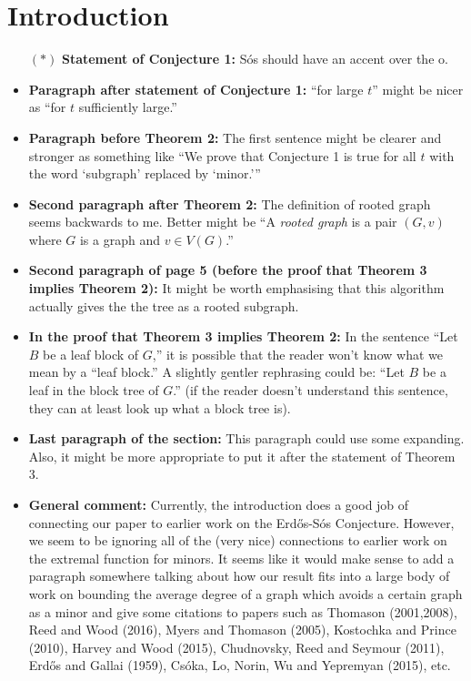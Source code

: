 \documentclass[11 pt]{article}
\begin{document}
\section{Introduction}

\begin{itemize}
\item[$\boldsymbol{(*)}$] \textbf{Statement of Conjecture 1:} S\'os should have an accent over the o. 
\item \textbf{Paragraph after statement of Conjecture 1:} ``for large $t$'' might be nicer as ``for $t$ sufficiently large.''
\item \textbf{Paragraph before Theorem 2:} The first sentence might be clearer and stronger as something like ``{We prove that Conjecture 1 is true for all $t$ with the word `subgraph' replaced by `minor.'}''
\item \textbf{Second paragraph after Theorem 2:} The definition of rooted graph seems backwards to me. Better might be ``A \emph{rooted graph} is a pair $(G,v)$ where $G$ is a graph and $v\in V(G)$.''
\item\textbf{Second paragraph of page 5 (before the proof that Theorem 3 implies Theorem 2):} It might be worth emphasising that this algorithm actually gives the the tree as a rooted subgraph. 
\item \textbf{In the proof that Theorem 3 implies Theorem 2:}  In the sentence ``Let $B$ be a leaf block of $G$,'' it is possible that the reader won't know what we mean by a ``leaf block.'' A slightly gentler rephrasing could be: ``Let $B$ be a leaf in the block tree of $G$.'' (if the reader doesn't understand this sentence, they can at least look up what a block tree is). 
\item \textbf{Last paragraph of the section:} This paragraph could use some expanding. Also, it might be more appropriate to put it after the statement of Theorem 3. 
\item \textbf{General comment:} Currently, the introduction does a good job of connecting our paper to earlier work on the Erd\H{o}s-S\'os Conjecture. However, we seem to be ignoring all of the (very nice) connections to earlier work on the extremal function for minors. It seems like it would make sense to add a paragraph somewhere talking about how our result fits into a large body of work on bounding the average degree of a graph which avoids a certain graph as a minor and give some citations to papers such as Thomason (2001,2008), Reed and Wood (2016), Myers and Thomason (2005), Kostochka and Prince (2010), Harvey and Wood (2015), Chudnovsky, Reed and Seymour (2011), Erd\H{o}s and Gallai (1959), Cs\'oka, Lo, Norin, Wu and Yepremyan (2015), etc. 
\end{itemize}
\end{document}
